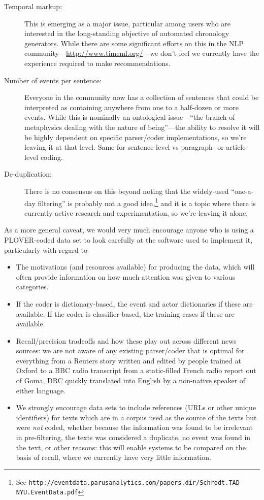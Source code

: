 \documentclass[11pt]{report}
\newcommand{\fn}[1]{\footnote{#1}}
\begin{document}
\begin{description}
\item[Temporal markup:] This is emerging as a major issue, particular among users who are interested in the long-standing objective of automated chronology generators. While there are some significant efforts on this in the NLP community---\url{http://www.timeml.org/}---we don't feel we currently have the experience required to make recommendations.
\item[Number of events per sentence:] Everyone in the community now has a collection of sentences that could be interpreted as containing anywhere from one to a half-dozen or more events. While this is nominally an ontological issue---``the branch of metaphysics dealing with the nature of being''---the ability to resolve it will be highly dependent on specific parser/coder implementations, so we're leaving it at that level. Same for sentence-level vs paragraph- or article-level coding.
\item[De-duplication:] There is no consensus on this beyond noting that the widely-used ``one-a-day filtering'' is probably not a good idea,\fn{See \texttt{http://eventdata.parusanalytics.com/papers.dir/Schrodt.TAD-NYU.EventData.pdf}} and it is a topic where there is currently active research and experimentation, so we're leaving it alone.
\end{description}

As a more general caveat, we would very much encourage anyone who is using a PLOVER-coded data set to look carefully at the software used to implement it, particularly with regard to
\begin{itemize}
\item The motivations (and resources available) for producing the data, which will often provide information on how much attention was given to various categories. 
\item If the coder is dictionary-based, the event and actor dictionaries if these are available. If the coder is classifier-based, the training cases if these are available.
\item Recall/precision tradeoffs and how these play out across different news sources: we are not aware of any existing parser/coder that is optimal for everything from a Reuters story written and edited by people trained at Oxford to a BBC radio transcript from a static-filled French radio report out of Goma, DRC quickly translated into English by a non-native speaker of either language.
\item We strongly encourage data sets to include references (URLs or other unique identifiers) for texts which are in a corpus used as the source of the texts but were \textit{not} coded, whether because the information was found to be irrelevant in pre-filtering, the texts was considered a duplicate, no event was found in the text, or other reasons: this will enable systems to be compared on the basis of recall, where we currently have very little information. 
\end{itemize}
\end{document}
